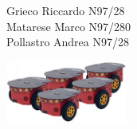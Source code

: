 \begin{center}
	{\large Grieco Riccardo N97/28 \\}
	{\large Matarese Marco N97/280 \\}
	{\large Pollastro Andrea N97/28 \\}
	
	\par\bigskip\par\bigskip\par\bigskip\par\bigskip\par\bigskip\par\bigskip	
	
	
	\includegraphics[width=0.3\textwidth]{images/pioneer.jpg}
\end{center}
